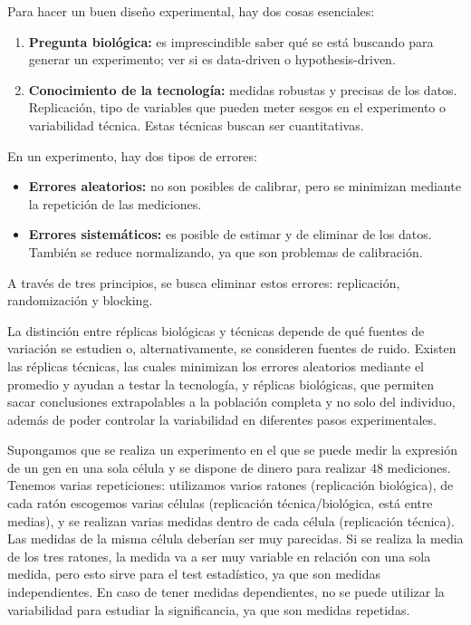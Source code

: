 Para hacer un buen diseño experimental, hay dos cosas esenciales:
\begin{enumerate}
\item \textbf{Pregunta biológica:} es imprescindible saber qué se está buscando para generar un experimento; ver si es data-driven o hypothesis-driven.
\item \textbf{Conocimiento de la tecnología:} medidas robustas y precisas de los datos. Replicación, tipo de variables que pueden meter sesgos en el experimento o variabilidad técnica. Estas técnicas buscan ser cuantitativas. 
\end{enumerate}

En un experimento, hay dos tipos de errores:
\begin{itemize}
\item \textbf{Errores aleatorios:} no son posibles de calibrar, pero se minimizan mediante la repetición de las mediciones.
\item \textbf{Errores sistemáticos:} es posible de estimar y de eliminar de los datos. También se reduce normalizando, ya que son problemas de calibración.
\end{itemize}

A través de tres principios, se busca eliminar estos errores: replicación, randomización y blocking.

La distinción entre réplicas biológicas y técnicas depende de qué fuentes de variación se estudien o, alternativamente, se consideren fuentes de ruido. Existen las réplicas técnicas, las cuales minimizan los errores aleatorios mediante el promedio y ayudan a testar la tecnología, y réplicas biológicas, que permiten sacar conclusiones extrapolables a la población completa y no solo del individuo, además de poder controlar la variabilidad en diferentes pasos experimentales.

Supongamos que se realiza un experimento en el que se puede medir la expresión de un gen en una sola célula y se dispone de dinero para realizar 48 mediciones. Tenemos varias repeticiones: utilizamos varios ratones (replicación biológica), de cada ratón escogemos varias células (replicación técnica/biológica, está entre medias), y se realizan varias medidas dentro de cada célula (replicación técnica). Las medidas de la misma célula deberían ser muy parecidas. Si se realiza la media de los tres ratones, la medida va a ser muy variable en relación con una sola medida, pero esto sirve para el test estadístico, ya que son medidas independientes. En caso de tener medidas dependientes, no se puede utilizar la variabilidad para estudiar la significancia, ya que son medidas repetidas. 

